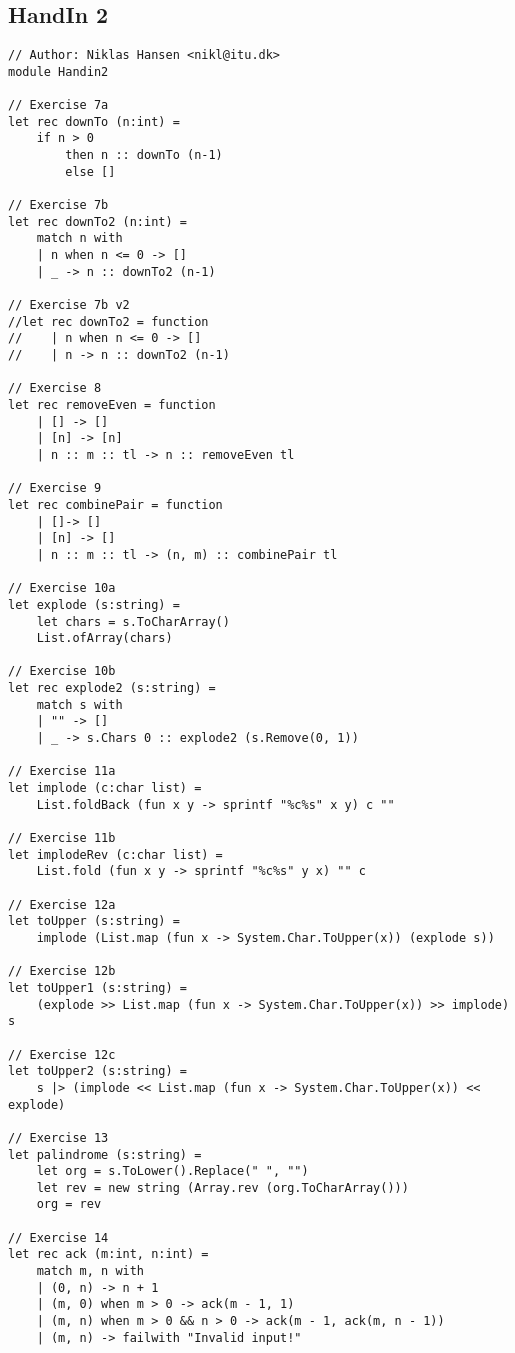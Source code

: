 \subsection{HandIn 2}
\label{Appendix_FSharp_Niklas_2}
\begin{lstlisting}
// Author: Niklas Hansen <nikl@itu.dk>
module Handin2

// Exercise 7a
let rec downTo (n:int) =
    if n > 0
        then n :: downTo (n-1)
        else []

// Exercise 7b
let rec downTo2 (n:int) =
    match n with
    | n when n <= 0 -> []
    | _ -> n :: downTo2 (n-1)

// Exercise 7b v2
//let rec downTo2 = function
//    | n when n <= 0 -> []
//    | n -> n :: downTo2 (n-1)

// Exercise 8
let rec removeEven = function
    | [] -> []
    | [n] -> [n]
    | n :: m :: tl -> n :: removeEven tl

// Exercise 9
let rec combinePair = function
    | []-> []
    | [n] -> []
    | n :: m :: tl -> (n, m) :: combinePair tl

// Exercise 10a
let explode (s:string) =
    let chars = s.ToCharArray()
    List.ofArray(chars)

// Exercise 10b
let rec explode2 (s:string) =
    match s with
    | "" -> []
    | _ -> s.Chars 0 :: explode2 (s.Remove(0, 1))

// Exercise 11a
let implode (c:char list) =
    List.foldBack (fun x y -> sprintf "%c%s" x y) c ""

// Exercise 11b
let implodeRev (c:char list) =
    List.fold (fun x y -> sprintf "%c%s" y x) "" c

// Exercise 12a
let toUpper (s:string) =
    implode (List.map (fun x -> System.Char.ToUpper(x)) (explode s))

// Exercise 12b
let toUpper1 (s:string) =
    (explode >> List.map (fun x -> System.Char.ToUpper(x)) >> implode) s

// Exercise 12c
let toUpper2 (s:string) =
    s |> (implode << List.map (fun x -> System.Char.ToUpper(x)) << explode)

// Exercise 13
let palindrome (s:string) =
    let org = s.ToLower().Replace(" ", "")
    let rev = new string (Array.rev (org.ToCharArray()))
    org = rev

// Exercise 14
let rec ack (m:int, n:int) =
    match m, n with
    | (0, n) -> n + 1
    | (m, 0) when m > 0 -> ack(m - 1, 1)
    | (m, n) when m > 0 && n > 0 -> ack(m - 1, ack(m, n - 1))
    | (m, n) -> failwith "Invalid input!"


\end{lstlisting}
